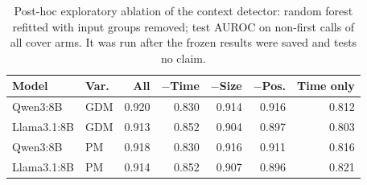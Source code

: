 \begin{table}[t]\centering\footnotesize
\caption{Post-hoc exploratory ablation of the context detector: random forest refitted with input groups removed; test AUROC on non-first calls of all cover arms. It was run after the frozen results were saved and tests no claim.}\label{tab:d-ablation}
\setlength{\tabcolsep}{2.5pt}
\begin{tabularx}{\columnwidth}{@{}Ylrrrrr@{}}\toprule
Model & Var. & All & $-$Time & $-$Size & $-$Pos. & Time only\\\midrule
Qwen3:8B & GDM & 0.920 & 0.830 & 0.914 & 0.916 & 0.812 \\
Llama3.1:8B & GDM & 0.913 & 0.852 & 0.904 & 0.897 & 0.803 \\
Qwen3:8B & PM & 0.918 & 0.830 & 0.916 & 0.911 & 0.816 \\
Llama3.1:8B & PM & 0.914 & 0.852 & 0.907 & 0.896 & 0.821 \\
\bottomrule\end{tabularx}
\end{table}
